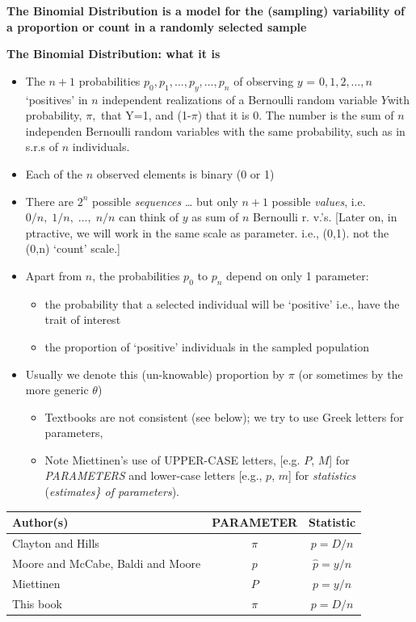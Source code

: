\documentclass[]{book}
\providecommand{\tightlist}{%
  \setlength{\itemsep}{0pt}\setlength{\parskip}{0pt}}
\begin{document}
\textbf{The Binomial Distribution is a model for the (sampling) variability of a proportion or count in a randomly selected sample}

\textbf{The Binomial Distribution: what it is}

\begin{itemize}
\item
  The \(n+1\) probabilities \(p_{0}, p_{1}, ..., p_{y}, ..., p_{n}\) of observing \(y\) = \(0, 1, 2, \dots , n\) `positives' in \(n\) independent realizations of a Bernoulli random variable \(Y\)with probability, \(\pi,\) that Y=1, and (1-\(\pi\)) that it is 0. The number is the sum of \(n\) independen Bernoulli random variables with the same probability, such as in s.r.s of \(n\) individuals.
\item
  Each of the \(n\) observed elements is binary (0 or 1)
\item
  There are \(2^{n}\) possible \emph{sequences} \ldots{} but only \(n+1\) possible \emph{values}, i.e. \(0/n,\;1/n,\;\dots ,\;n/n\) can think of \(y\) as sum of \(n\) Bernoulli r. v.'s. {[}Later on, in ptractive, we will work in the same scale as parameter. i.e., (0,1). not the (0,n) `count' scale.{]}
\item
  Apart from \(n\), the probabilities \(p_{0}\) to \(p_{n}\) depend on only 1 parameter:

  \begin{itemize}
  \tightlist
  \item
    the probability that a selected individual will be `positive' i.e., have the trait of interest
  \item
    the proportion of `positive' individuals in the sampled population
  \end{itemize}
\item
  Usually we denote this (un-knowable) proportion by \(\pi\) (or sometimes by the more generic \(\theta\))

  \begin{itemize}
  \tightlist
  \item
    Textbooks are not consistent (see below); we try to use Greek letters for parameters,
  \item
    Note Miettinen's use of UPPER-CASE letters, {[}e.g. \(P\), \(M\){]} for \emph{PARAMETERS} and lower-case letters {[}e.g., \(p\), \(m\){]} for \emph{statistics} (\emph{estimates\} of parameters}).
  \end{itemize}
\end{itemize}

\begin{longtable}[]{@{}lcc@{}}
\toprule
Author(s) & PARAMETER & Statistic\tabularnewline
\midrule
\endhead
Clayton and Hills & \(\pi\) & \(p = D/n\)\tabularnewline
Moore and McCabe, Baldi and Moore & \(p\) & \(\hat{p} = y/n\)\tabularnewline
Miettinen & \(P\) & \(p = y/n\)\tabularnewline
This book & \(\pi\) & \(p = D/n\)\tabularnewline
\bottomrule
\end{longtable}
\end{document}
